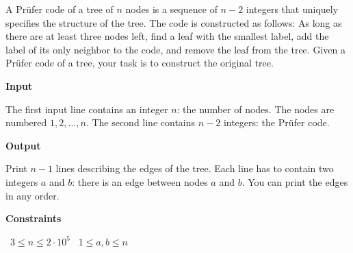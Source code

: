 A Prüfer code of a tree of $n$ nodes is a sequence of $n-2$ integers that uniquely specifies the structure of the tree.
The code is constructed as follows: As long as there are at least three nodes left, find a leaf with the smallest label, add the label of its only neighbor to the code, and remove the leaf from the tree.
Given a Prüfer code of a tree, your task is to construct the original tree.

\vspace{0.3cm}\noindent\textbf{Input}

The first input line contains an integer $n$: the number of nodes. The nodes are numbered $1,2,\ldots,n$.
The second line contains $n-2$ integers: the Prüfer code.

\vspace{0.3cm}\noindent\textbf{Output}

Print $n-1$ lines describing the edges of the tree. Each line has to contain two integers $a$ and $b$: there is an edge between nodes $a$ and $b$. You can print the edges in any order.

\vspace{0.3cm}\noindent\textbf{Constraints}

\textbullet\ $3 \le n \le 2 \cdot 10^5$
\textbullet\ $1 \le a,b \le n$